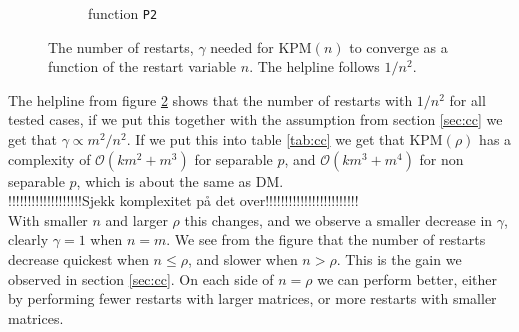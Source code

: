 \begin{figure}[H]
\begin{subfigure}[b]{0.45\textwidth}
                \caption{function \texttt{P2}}
                \label{fig:ant2}
        \end{subfigure}
        \caption{The number of restarts, $\gamma$ needed for KPM$(n)$ to converge as a function of the restart variable $n$. The helpline follows $1/n^2$.}\label{fig:ant}
\end{figure}

The helpline from figure \ref{fig:ant} shows that the number of restarts with $1/n^2$ for all tested cases, if we put this together with the assumption from section \ref{sec:cc} we get that $\gamma \propto  m^2/n^2$. If we put this into table \ref{tab:cc} we get that KPM$(\rho)$ has a complexity of $\mathcal{O}(km^2 + m^3)$ for separable $p$, and $\mathcal{O}(km^3 + m^4)$ for non separable $p$, which is about the same as DM.
\\!!!!!!!!!!!!!!!!!!!Sjekk komplexitet på det over!!!!!!!!!!!!!!!!!!!!!!!!\\
With smaller $n$ and larger $\rho$ this changes, and we observe a smaller decrease in $\gamma$, clearly $\gamma=1$ when $n=m$. We see from the figure that the number of restarts decrease quickest when $n \leq \rho $, and slower when $n > \rho$. This is the gain we observed in section \ref{sec:cc}. On each side of $n = \rho$ we can perform better, either by performing fewer restarts with larger matrices, or more restarts with smaller matrices. \\
